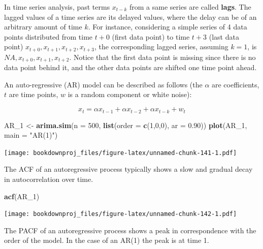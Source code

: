 \documentclass[
]{article}
\newenvironment{Shaded}{\begin{snugshade}}{\end{snugshade}}
\newcommand{\DataTypeTok}[1]{\textcolor[rgb]{0.13,0.29,0.53}{#1}}
\newcommand{\DecValTok}[1]{\textcolor[rgb]{0.00,0.00,0.81}{#1}}
\newcommand{\FloatTok}[1]{\textcolor[rgb]{0.00,0.00,0.81}{#1}}
\newcommand{\KeywordTok}[1]{\textcolor[rgb]{0.13,0.29,0.53}{\textbf{#1}}}
\newcommand{\NormalTok}[1]{#1}
\newcommand{\StringTok}[1]{\textcolor[rgb]{0.31,0.60,0.02}{#1}}
\begin{document}
In time series analysis, past terms \(x_{t-k}\) from a same series are called \textbf{lags}. The lagged values of a time series are its delayed values, where the delay can be of an arbitrary amount of time \(k\). For instance, considering a simple series of 4 data points distributed from time \({t+0}\) (first data point) to time \({t+3}\) (last data point) \({x_{t+0}, x_{t+1}, x_{t+2}, x_{t+3}}\), the corresponding lagged series, assuming \(k=1\), is \({NA, x_{t+0}, x_{t+1}, x_{t+2}}\). Notice that the first data point is missing since there is no data point behind it, and the other data points are shifted one time point ahead.

An auto-regressive (AR) model can be described as follows (the \(\alpha\) are coefficients, \(t\) are time points, \(w\) is a random component or white noise):

\[
{x_t} = \alpha x_{t-1} + \alpha x_{t-2} + \alpha x_{t-k} + {w_t}
\]

\begin{Shaded}
\begin{Highlighting}[]
\NormalTok{AR_}\DecValTok{1}\NormalTok{ <-}\StringTok{ }\KeywordTok{arima.sim}\NormalTok{(}\DataTypeTok{n =} \DecValTok{500}\NormalTok{, }\KeywordTok{list}\NormalTok{(}\DataTypeTok{order =} \KeywordTok{c}\NormalTok{(}\DecValTok{1}\NormalTok{,}\DecValTok{0}\NormalTok{,}\DecValTok{0}\NormalTok{), }\DataTypeTok{ar =} \FloatTok{0.90}\NormalTok{))}
\KeywordTok{plot}\NormalTok{(AR_}\DecValTok{1}\NormalTok{, }\DataTypeTok{main =} \StringTok{"AR(1)"}\NormalTok{)}
\end{Highlighting}
\end{Shaded}

\texttt{[image: bookdownproj\_files/figure-latex/unnamed-chunk-141-1.pdf]}

The ACF of an autoregressive process typically shows a slow and gradual decay in autocorrelation over time.

\begin{Shaded}
\begin{Highlighting}[]
\KeywordTok{acf}\NormalTok{(AR_}\DecValTok{1}\NormalTok{)}
\end{Highlighting}
\end{Shaded}

\texttt{[image: bookdownproj\_files/figure-latex/unnamed-chunk-142-1.pdf]}

The PACF of an autoregressive process shows a peak in correspondence with the order of the model. In the case of an AR(1) the peak is at time 1.
\end{document}
